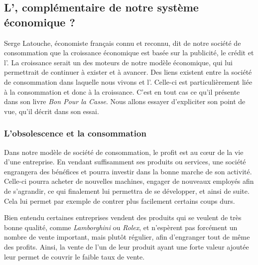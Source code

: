 \subsection{L'\OP, complémentaire de notre système économique ?}

Serge Latouche, économiste français connu et reconnu, dit de notre société de consommation que la croissance économique est basée sur la publicité, le crédit et l'\op. La croissance serait un des moteurs de notre modèle économique, qui lui permettrait de continuer à exister et à avancer. Des liens existent entre la société de consommation dans laquelle nous vivons et l'\op. Celle-ci est particulièrement liée à la consommation et donc à la croissance. C'est en tout cas ce qu'il présente dans son livre \textit{Bon Pour la Casse}. Nous allons essayer d'expliciter son point de vue, qu'il décrit dans son essai.


\subsubsection{L'obsolescence et la consommation}
Dans notre modèle de société de consommation, le profit est au cœur de la vie d'une entreprise. En vendant suffisamment ses produits ou services, une société engrangera des bénéfices et pourra investir dans la bonne marche de son activité. Celle-ci pourra acheter de nouvelles machines, engager de nouveaux employés afin de s'agrandir, ce qui finalement lui permettra de se développer, et ainsi de suite. Cela lui permet par exemple de contrer plus facilement certains coups durs.

Bien entendu certaines entreprises vendent des produits qui se veulent de très bonne qualité, comme \textit{Lamborghini} ou \textit{Rolex}, et n'espèrent pas forcément un nombre de vente important, mais plutôt régulier, afin d'engranger tout de même des profits. Ainsi, la vente de l'un de leur produit ayant une forte valeur ajoutée leur permet de couvrir le faible taux de vente.


